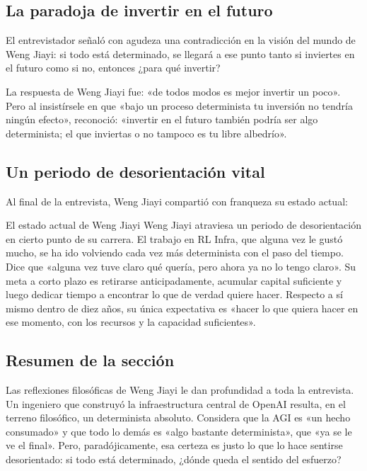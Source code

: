 \subsection{La paradoja de invertir en el futuro}

El entrevistador señaló con agudeza una contradicción en la visión del mundo de Weng Jiayi: si todo está determinado, se llegará a ese punto tanto si inviertes en el futuro como si no, entonces ¿para qué invertir?

La respuesta de Weng Jiayi fue: «de todos modos es mejor invertir un poco». Pero al insistírsele en que «bajo un proceso determinista tu inversión no tendría ningún efecto», reconoció: «invertir en el futuro también podría ser algo determinista; el que inviertas o no tampoco es tu libre albedrío».

\subsection{Un periodo de desorientación vital}

Al final de la entrevista, Weng Jiayi compartió con franqueza su estado actual:

\begin{knowledgebox}{El estado actual de Weng Jiayi}
Weng Jiayi atraviesa un periodo de desorientación en cierto punto de su carrera. El trabajo en RL Infra, que alguna vez le gustó mucho, se ha ido volviendo cada vez más determinista con el paso del tiempo. Dice que «alguna vez tuve claro qué quería, pero ahora ya no lo tengo claro». Su meta a corto plazo es retirarse anticipadamente, acumular capital suficiente y luego dedicar tiempo a encontrar lo que de verdad quiere hacer. Respecto a sí mismo dentro de diez años, su única expectativa es «hacer lo que quiera hacer en ese momento, con los recursos y la capacidad suficientes».
\end{knowledgebox}

\subsection{Resumen de la sección}

Las reflexiones filosóficas de Weng Jiayi le dan profundidad a toda la entrevista. Un ingeniero que construyó la infraestructura central de OpenAI resulta, en el terreno filosófico, un determinista absoluto. Considera que la AGI es «un hecho consumado» y que todo lo demás es «algo bastante determinista», que «ya se le ve el final». Pero, paradójicamente, esa certeza es justo lo que lo hace sentirse desorientado: si todo está determinado, ¿dónde queda el sentido del esfuerzo?

